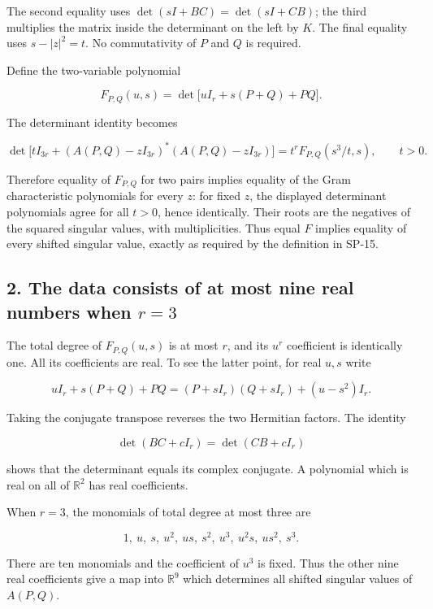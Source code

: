 \documentclass[10pt,a4paper]{article}
\begin{document}
The second equality uses \(\det(sI+BC)=\det(sI+CB)\); the third
multiplies the matrix inside the determinant on the left by \(K\). The
final equality uses \(s-|z|^2=t\). No commutativity of \(P\) and \(Q\)
is required.

Define the two-variable polynomial

\nopagebreak[4]
\[
F_{P,Q}(u,s)=\det\bigl[uI_r+s(P+Q)+PQ\bigr].
\]

The determinant identity becomes

\nopagebreak[4]
\[
\det\bigl[tI_{3r}+(A(P,Q)-zI_{3r})^*(A(P,Q)-zI_{3r})\bigr]
=t^r F_{P,Q}(s^3/t,s),\qquad t>0.
\]

Therefore equality of \(F_{P,Q}\) for two pairs implies equality of the
Gram characteristic polynomials for every \(z\): for fixed \(z\), the
displayed determinant polynomials agree for all \(t>0\), hence
identically. Their roots are the negatives of the squared singular
values, with multiplicities. Thus equal \(F\) implies equality of every
shifted singular value, exactly as required by the definition in SP-15.

\subsection{\texorpdfstring{2. The data consists of at most nine real
numbers when
\(r=3\)}{2. The data consists of at most nine real numbers when r=3}}\label{the-data-consists-of-at-most-nine-real-numbers-when-r3}

The total degree of \(F_{P,Q}(u,s)\) is at most \(r\), and its \(u^r\)
coefficient is identically one. All its coefficients are real. To see
the latter point, for real \(u,s\) write

\nopagebreak[4]
\[
uI_r+s(P+Q)+PQ=(P+sI_r)(Q+sI_r)+(u-s^2)I_r.
\]

Taking the conjugate transpose reverses the two Hermitian factors. The
identity

\nopagebreak[4]
\[
\det(BC+cI_r)=\det(CB+cI_r)
\]

shows that the determinant equals its complex conjugate. A polynomial
which is real on all of \(\mathbb R^2\) has real coefficients.

When \(r=3\), the monomials of total degree at most three are

\nopagebreak[4]
\[
1,\ u,\ s,\ u^2,\ us,\ s^2,\ u^3,\ u^2s,\ us^2,\ s^3.
\]

There are ten monomials and the coefficient of \(u^3\) is fixed. Thus
the other nine real coefficients give a map into \(\mathbb R^9\) which
determines all shifted singular values of \(A(P,Q)\).
\end{document}
